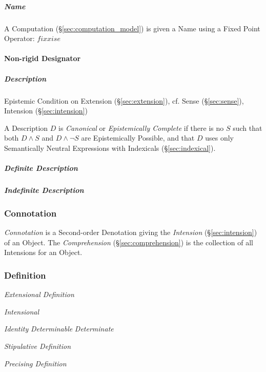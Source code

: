 \subparagraph{Name}\label{sec:name}\hfill

A Computation (\S\ref{sec:computation_model}) is given a Name using a
Fixed Point Operator: $fix x is e$



\paragraph{Non-rigid Designator}\label{sec:nonrigid_designator}\hfill

\subparagraph{Description}\label{sec:description}\hfill
\cite{chalmers02}

Epistemic Condition on Extension (\S\ref{sec:extension}), cf. Sense
(\S\ref{sec:sense}), Intension (\S\ref{sec:intension})

A Description $D$ is \emph{Canonical} or \emph{Epistemically Complete}
if there is no $S$ such that both $D \wedge S$ and $D \wedge \neg S$
are Epistemically Possible, and that $D$ uses only Semantically
Neutral Expressions with Indexicals (\S\ref{sec:indexical}).

\subparagraph{Definite Description}\label{sec:definite_description}\hfill

\subparagraph{Indefinite Description}\label{sec:indefinite_description}\hfill



\subsubsection{Connotation}\label{sec:connotation}

\emph{Connotation} is a Second-order Denotation giving the
\emph{Intension} (\S\ref{sec:intension}) of an Object. The
\emph{Comprehension} (\S\ref{sec:comprehension}) is the collection of
all Intensions for an Object.



\subsubsection{Definition}\label{sec:definition}

\emph{Extensional Definition}

\emph{Intensional}

\emph{Identity} \emph{Determinable} \emph{Determinate}

\emph{Stipulative Definition}

\emph{Precising Definition}

